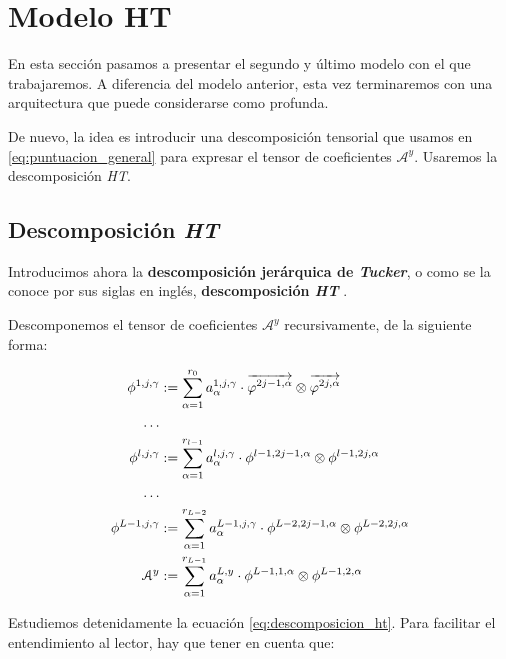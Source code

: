 \section{Modelo HT} \label{sec:modelo_ht}

En esta sección pasamos a presentar el segundo y último modelo con el que trabajaremos. A diferencia del modelo anterior, esta vez terminaremos con una arquitectura que puede considerarse como profunda.

De nuevo, la idea es introducir una descomposición tensorial que usamos en \eqref{eq:puntuacion_general} para expresar el tensor de coeficientes $\mathcal{A}^y$. Usaremos la descomposición \textit{HT}.

\subsection{Descomposición \textit{HT}} \label{subs:descomposicion_ht}

Introducimos ahora la \textbf{descomposición jerárquica de \textit{Tucker}}, o como se la conoce por sus siglas en inglés, \textbf{descomposición \textit{HT}} \cite{matematicas:descomposicion_ht} \cite{matematicas:principal}.

Descomponemos el tensor de coeficientes $\mathcal{A}^y$ recursivamente, de la siguiente forma:

\begin{equation} \label{eq:descomposicion_ht}
	\begin{split}
		\phi^{1, j, \gamma} &:= \sum_{\alpha = 1}^{r_0} a_{\alpha}^{1, j, \gamma} \cdot \overrightarrow{\varphi^{2j-1, \alpha}} \otimes \overrightarrow{\varphi^{2j, \alpha}} \\
		\ldots \\
		\phi^{l, j, \gamma} &:= \sum_{\alpha = 1}^{r_{l-1}} a_{\alpha}^{l, j, \gamma} \cdot \phi^{l-1, 2j-1, \alpha} \otimes \phi^{l-1, 2j, \alpha} \\
		\ldots \\
		\phi^{L - 1, j, \gamma} &:= \sum_{\alpha = 1}^{r_{L-2}} a_{\alpha}^{L - 1, j, \gamma} \cdot \phi^{L-2, 2j-1, \alpha} \otimes \phi^{L-2, 2j, \alpha} \\
		\mathcal{A}^y &:= \sum_{\alpha = 1}^{r_{L-1}} a_{\alpha}^{L, y} \cdot \phi^{L-1, 1, \alpha} \otimes \phi^{L-1, 2, \alpha}
	\end{split}
\end{equation}

Estudiemos detenidamente la ecuación \eqref{eq:descomposicion_ht}. Para facilitar el entendimiento al lector, hay que tener en cuenta que:

